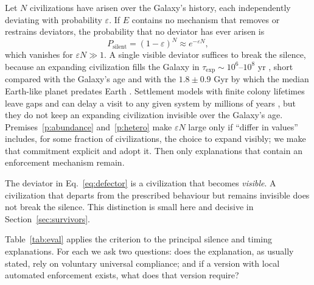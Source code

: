 \documentclass[preprint,12pt]{elsarticle}
\theoremstyle{definition}
\begin{document}
Let $N$ civilizations have arisen over the Galaxy's history, each independently deviating with probability $\varepsilon$. If $E$ contains no mechanism that removes or restrains deviators, the probability that no deviator has ever arisen is
\begin{equation}
P_{\text{silent}} = (1 - \varepsilon)^{N} \approx e^{-\varepsilon N},
\label{eq:defector}
\end{equation}
which vanishes for $\varepsilon N \gg 1$. A single visible deviator suffices to break the silence, because an expanding civilization fills the Galaxy in $\tau_{\text{exp}} \sim 10^{6}$--$10^{8}$ yr \citep{Hart1975,Tipler1980}, short compared with the Galaxy's age and with the $1.8 \pm 0.9$ Gyr by which the median Earth-like planet predates Earth \citep{Lineweaver2001}. Settlement models with finite colony lifetimes leave gaps and can delay a visit to any given system by millions of years \citep{CarrollNellenback2019}, but they do not keep an expanding civilization invisible over the Galaxy's age. Premises~\ref{p:abundance} and~\ref{p:hetero} make $\varepsilon N$ large only if ``differ in values'' includes, for some fraction of civilizations, the choice to expand visibly; we make that commitment explicit and adopt it. Then only explanations that contain an enforcement mechanism remain.

The deviator in Eq.~\eqref{eq:defector} is a civilization that becomes \emph{visible}. A civilization that departs from the prescribed behaviour but remains invisible does not break the silence. This distinction is small here and decisive in Section~\ref{sec:survivors}.

Table~\ref{tab:eval} applies the criterion to the principal silence and timing explanations. For each we ask two questions: does the explanation, as usually stated, rely on voluntary universal compliance; and if a version with local automated enforcement exists, what does that version require?
\end{document}
